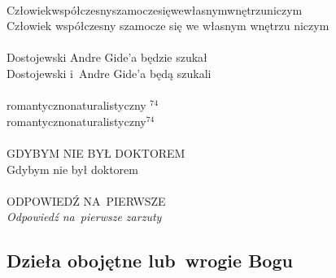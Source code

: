 \documentclass[a4paper,11pt]{article}
\begin{document}
\vspace{\spaceTwo}


\noindent
{} \\
\Jest  Człowiekwspółczesnyszamoczesięwewłasnymwnętrzuniczym \\
\Powin Człowiek współczesny szamocze się we własnym wnętrzu niczym \\
 \\
\Jest  Dostojewski Andre Gide'a będzie szukał \\
\Powin Dostojewski i~Andre Gide'a będą szukali \\
 \\
\Jest  romantyczno\dywiz naturalistyczny $^{ 74 }$ \\
\Powin romantyczno\dywiz naturalistyczny$^{ 74 }$ \\
 \\
\Jest  G{\footnotesize DYBYM NIE BYŁ DOKTOREM} \\
\Powin Gdybym nie był doktorem \\
 \\
\Jest  ODPOWIEDŹ NA~PIERWSZE \\
\Powin \textit{Odpowiedź na~pierwsze zarzuty} \\












\newpage

\subsection{Dzieła obojętne lub~wrogie Bogu}

\vspace{\spaceTwo}




\vspace{0em}
\end{document}
